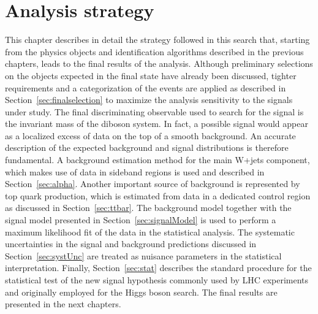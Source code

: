 \chapter{Analysis strategy}\label{ch:strategy}

This chapter describes in detail the strategy followed in this search that, starting from the physics objects and identification algorithms described in the previous chapters, leads to the final results of the analysis.
Although preliminary selections on the objects expected in the final state have already been discussed, tighter requirements and a categorization of the events are applied as described in Section~\ref{sec:finalselection} to maximize the analysis sensitivity to the signals under study. The final discriminating observable used to search for the signal is the invariant mass of the diboson system. In fact, a possible signal would appear as a localized excess of data on the top of a smooth background. An accurate description of the expected background and signal distributions is therefore fundamental. A background estimation method for the main W+jets component, which makes use of data in sideband regions is used and described in Section~\ref{sec:alpha}. Another important source of background is represented by top quark production, which is estimated from data in a dedicated control region as discussed in Section~\ref{sec:ttbar}. The background model together with the signal model presented in Section~\ref{sec:signalModel} is used to perform a maximum likelihood fit of the data in the statistical analysis.
The systematic uncertainties in the signal and background predictions discussed in Section~\ref{sec:systUnc} are treated as nuisance parameters in the statistical interpretation.
Finally, Section~\ref{sec:stat} describes the standard procedure for the statistical test of the new signal hypothesis commonly used by LHC experiments and originally employed for the Higgs boson search.
The final results are presented in the next chapters.

 
  
 
 
